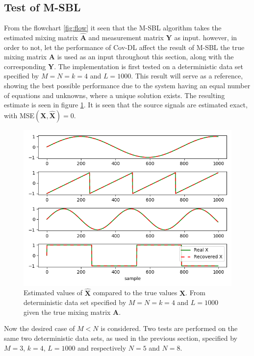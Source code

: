 \subsection{Test of M-SBL}
From the flowchart \ref{fig:flow} it seen that the M-SBL algorithm takes the estimated mixing matrix $\hat{\mathbf{A}}$ and measurement matrix $\mathbf{Y}$ as input. however, in order to not, let the performance of Cov-DL affect the result of M-SBL the true mixing matrix $\mathbf{A}$ is used as an input throughout this section, along with the corresponding $\mathbf{Y}$. 
The implementation is first tested on a deterministic data set specified by $M = N = k = 4$ and $L=1000$. 
This result will serve as a reference, showing the best possible performance due to the system having an equal number of equations and unknowns, where a unique solution exists.
The resulting estimate is seen in figure \ref{fig:M-SBL_simple0}. 
It is seen that the source signals are estimated exact, with MSE$(\mathbf{X}, \hat{\mathbf{X}}) = 0$. 
\begin{figure}[H]
\centering
\includegraphics[scale=0.5]{figures/ch_6/M-SBL_simple0.png}
\caption{Estimated values of $\hat{\mathbf{X}}$ compared to the true values $\mathbf{X}$. From deterministic data set specified by $M = N = k = 4$ and $L=1000$ given the true mixing matrix $\mathbf{A}$.}
\label{fig:M-SBL_simple0}
\end{figure}
\noindent
Now the desired case of $M < N$ is considered. 
Two tests are performed on the same two deterministic data sets, as used in the previous section, specified by $M = 3$, $k = 4$, $L=1000$ and respectively $N = 5$ and $N = 8$.

